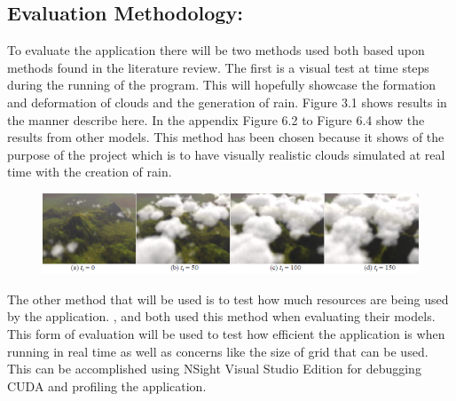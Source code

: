 \subsection{Evaluation Methodology:}
To evaluate the application there will be two methods used both based upon methods found in the literature review.
The first is a visual test at time steps during the running of the program.
This will hopefully showcase the formation and deformation of clouds and the generation of rain.
Figure 3.1 shows \citet{DobashiEtAl00} results in the manner describe here.
In the appendix Figure 6.2 to Figure 6.4 show the results from other models.
This method has been chosen because it shows of the purpose of the project which is to have visually realistic clouds simulated at real time with the creation of rain. \\
\begin{figure}[h!]\label{fig:Simple Realistic Animation of Clouds}
  \centering
  \includegraphics[width=140mm]{images/Simple_Realistic_Animation_of_Clouds.PNG}
  \caption{\citet{DobashiEtAl00}}
\end{figure}

The other method that will be used is to test how much resources are being used by the application.
\citet*{MHarris01}, and \citet{Elek12} both used this method when evaluating their models.
This form of evaluation will be used to test how efficient the application is when running in real time as well as concerns like the size of grid that can be used.
This can be accomplished using NSight Visual Studio Edition for debugging CUDA and profiling the application.